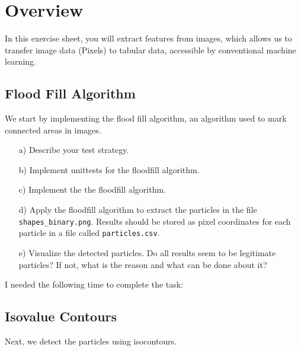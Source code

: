 \def\firstname{Tim}
\def\lastname{Dahmen}
\def\aufgabenblatt{4}




\thispagestyle{page1} 

\section{Overview}

In this exercise sheet, you will extract features from images, which allows us to transfer image data (Pixels) to tabular data, accessible by conventional machine learning.

\subsection{Flood Fill Algorithm}

We start by implementing the flood fill algorithm, an algorithm used to mark connected areas in images. 

\begin{enumerate}

\item[a)] Describe your test strategy.

\item[b)] Implement unittests for the floodfill algorithm.

\item[c)] Implement the the floodfill algorithm.

\item[d)] Apply the floodfill algorithm to extract the particles in the file \texttt{shapes\_binary.png}. Results should be stored as pixel coordinates for each particle in a file called \texttt{particles.csv}.

\item[e)] Visualize the detected particles. Do all results seem to be legitimate particles? If not, what is the reason and what can be done about it?

\end{enumerate}

I needed the following time to complete the task:

\subsection{Isovalue Contours}

Next, we detect the particles using isocontours. 

